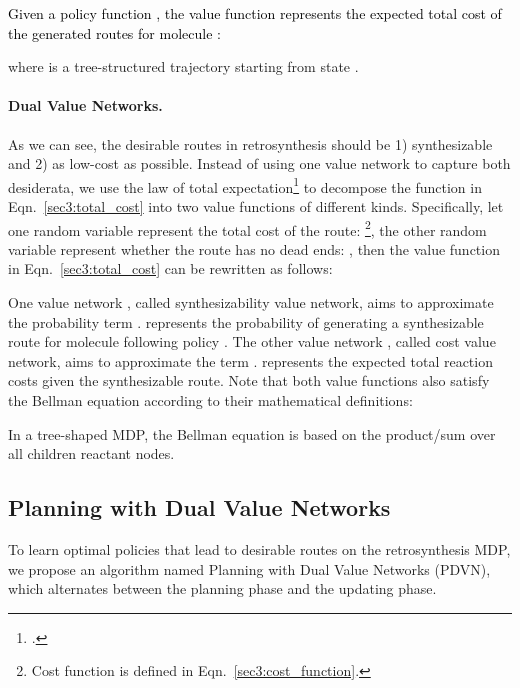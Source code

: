 \documentclass[nohyperref]{article}
\theoremstyle{plain}
\theoremstyle{definition}
\theoremstyle{remark}
\begin{document}
\textcolor{black}{
Given a policy function , the value function represents the expected total cost of the generated routes for molecule :
}

where  is a tree-structured trajectory starting from state .





\paragraph{Dual Value Networks.}
As we can see, the desirable routes in retrosynthesis should be 1) synthesizable and 2) as low-cost as possible.
Instead of using one value network to capture both desiderata, we use the law of total expectation\footnote{.} to decompose the function in Eqn.~\ref{sec3:total_cost} into two value functions of different kinds. Specifically,
let one random variable  represent the total cost of the route: \footnote{Cost function  is defined in Eqn.~\ref{sec3:cost_function}.}, 
the other random variable  represent whether the route has no dead ends:  ,
then the value function in Eqn.~\ref{sec3:total_cost} can be rewritten as follows:


One value network , called synthesizability value network, aims to approximate the probability term . 
 represents the probability of generating a synthesizable route for molecule 
following policy . 
The other value network , called cost value network, aims to approximate the term . 
 represents the expected total reaction costs given the synthesizable route.
Note that both value functions also satisfy the Bellman equation according to their mathematical definitions:

In a tree-shaped MDP, the Bellman equation is based on the product/sum over all children reactant nodes.



\subsection{Planning with Dual Value Networks}\label{sec:planning}


To learn optimal policies that lead to desirable routes on the retrosynthesis MDP, we propose an algorithm named Planning with Dual Value Networks (PDVN), which alternates between the planning phase and the updating phase. 
\end{document}

